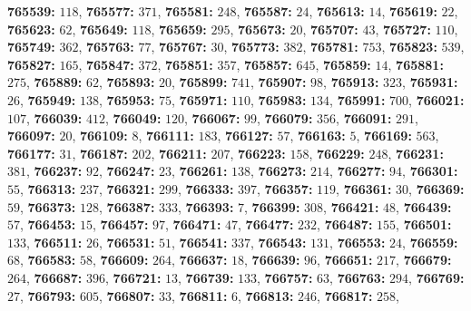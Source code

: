\textsf{\bfseries 765539:} $118$, \textsf{\bfseries 765577:} $371$, \textsf{\bfseries 765581:} $248$, \textsf{\bfseries 765587:} $24$, \textsf{\bfseries 765613:} $14$, \textsf{\bfseries 765619:} $22$, \textsf{\bfseries 765623:} $62$, \textsf{\bfseries 765649:} $118$, \textsf{\bfseries 765659:} $295$, \textsf{\bfseries 765673:} $20$, \textsf{\bfseries 765707:} $43$, \textsf{\bfseries 765727:} $110$, \textsf{\bfseries 765749:} $362$, \textsf{\bfseries 765763:} $77$, \textsf{\bfseries 765767:} $30$, \textsf{\bfseries 765773:} $382$, \textsf{\bfseries 765781:} $753$, \textsf{\bfseries 765823:} $539$, \textsf{\bfseries 765827:} $165$, \textsf{\bfseries 765847:} $372$, \textsf{\bfseries 765851:} $357$, \textsf{\bfseries 765857:} $645$, \textsf{\bfseries 765859:} $14$, \textsf{\bfseries 765881:} $275$, \textsf{\bfseries 765889:} $62$, \textsf{\bfseries 765893:} $20$, \textsf{\bfseries 765899:} $741$, \textsf{\bfseries 765907:} $98$, \textsf{\bfseries 765913:} $323$, \textsf{\bfseries 765931:} $26$, \textsf{\bfseries 765949:} $138$, \textsf{\bfseries 765953:} $75$, \textsf{\bfseries 765971:} $110$, \textsf{\bfseries 765983:} $134$, \textsf{\bfseries 765991:} $700$, \textsf{\bfseries 766021:} $107$, \textsf{\bfseries 766039:} $412$, \textsf{\bfseries 766049:} $120$, \textsf{\bfseries 766067:} $99$, \textsf{\bfseries 766079:} $356$, \textsf{\bfseries 766091:} $291$, \textsf{\bfseries 766097:} $20$, \textsf{\bfseries 766109:} $8$, \textsf{\bfseries 766111:} $183$, \textsf{\bfseries 766127:} $57$, \textsf{\bfseries 766163:} $5$, \textsf{\bfseries 766169:} $563$, \textsf{\bfseries 766177:} $31$, \textsf{\bfseries 766187:} $202$, \textsf{\bfseries 766211:} $207$, \textsf{\bfseries 766223:} $158$, \textsf{\bfseries 766229:} $248$, \textsf{\bfseries 766231:} $381$, \textsf{\bfseries 766237:} $92$, \textsf{\bfseries 766247:} $23$, \textsf{\bfseries 766261:} $138$, \textsf{\bfseries 766273:} $214$, \textsf{\bfseries 766277:} $94$, \textsf{\bfseries 766301:} $55$, \textsf{\bfseries 766313:} $237$, \textsf{\bfseries 766321:} $299$, \textsf{\bfseries 766333:} $397$, \textsf{\bfseries 766357:} $119$, \textsf{\bfseries 766361:} $30$, \textsf{\bfseries 766369:} $59$, \textsf{\bfseries 766373:} $128$, \textsf{\bfseries 766387:} $333$, \textsf{\bfseries 766393:} $7$, \textsf{\bfseries 766399:} $308$, \textsf{\bfseries 766421:} $48$, \textsf{\bfseries 766439:} $57$, \textsf{\bfseries 766453:} $15$, \textsf{\bfseries 766457:} $97$, \textsf{\bfseries 766471:} $47$, \textsf{\bfseries 766477:} $232$, \textsf{\bfseries 766487:} $155$, \textsf{\bfseries 766501:} $133$, \textsf{\bfseries 766511:} $26$, \textsf{\bfseries 766531:} $51$, \textsf{\bfseries 766541:} $337$, \textsf{\bfseries 766543:} $131$, \textsf{\bfseries 766553:} $24$, \textsf{\bfseries 766559:} $68$, \textsf{\bfseries 766583:} $58$, \textsf{\bfseries 766609:} $264$, \textsf{\bfseries 766637:} $18$, \textsf{\bfseries 766639:} $96$, \textsf{\bfseries 766651:} $217$, \textsf{\bfseries 766679:} $264$, \textsf{\bfseries 766687:} $396$, \textsf{\bfseries 766721:} $13$, \textsf{\bfseries 766739:} $133$, \textsf{\bfseries 766757:} $63$, \textsf{\bfseries 766763:} $294$, \textsf{\bfseries 766769:} $27$, \textsf{\bfseries 766793:} $605$, \textsf{\bfseries 766807:} $33$, \textsf{\bfseries 766811:} $6$, \textsf{\bfseries 766813:} $246$, \textsf{\bfseries 766817:} $258$, 
